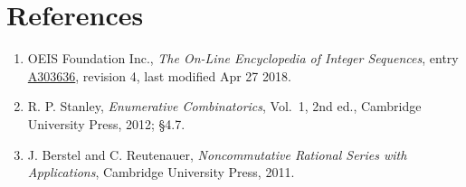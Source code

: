 \documentclass[11pt]{article}
\theoremstyle{definition}
\begin{document}
\section{References}

\begin{enumerate}

\item OEIS Foundation Inc., \emph{The On-Line Encyclopedia of Integer Sequences}, entry \href{https://oeis.org/A303636}{A303636}, revision 4, last modified Apr 27 2018.

\item R. P. Stanley, \emph{Enumerative Combinatorics}, Vol.~1, 2nd ed., Cambridge University Press, 2012; \S4.7.

\item J. Berstel and C. Reutenauer, \emph{Noncommutative Rational Series with Applications}, Cambridge University Press, 2011.

\end{enumerate}
\end{document}
